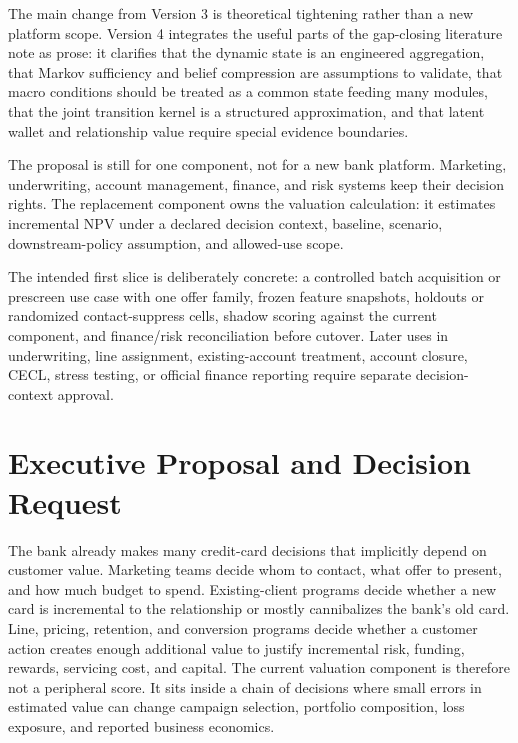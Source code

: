 \documentclass[11pt]{article}
\newcommand{\1}{\mathbf{1}}
\begin{document}
The main change from Version 3 is theoretical tightening rather than a new
platform scope. Version 4 integrates the useful parts of the gap-closing
literature note as prose: it clarifies that the dynamic state is an engineered
aggregation, that Markov sufficiency and belief compression are assumptions to
validate, that macro conditions should be treated as a common state feeding many
modules, that the joint transition kernel is a structured approximation, and
that latent wallet and relationship value require special evidence boundaries.

The proposal is still for one component, not for a new bank platform.  Marketing,
underwriting, account management, finance, and risk systems keep their decision
rights.  The replacement component owns the valuation calculation: it estimates
incremental NPV under a declared decision context, baseline, scenario,
downstream-policy assumption, and allowed-use scope.

The intended first slice is deliberately concrete: a controlled batch
acquisition or prescreen use case with one offer family, frozen feature
snapshots, holdouts or randomized contact-suppress cells, shadow scoring against
the current component, and finance/risk reconciliation before cutover. Later
uses in underwriting, line assignment, existing-account treatment, account
closure, CECL, stress testing, or official finance reporting require separate
decision-context approval.

\tableofcontents
\clearpage

\section{Executive Proposal and Decision Request}
\label{sec:executive-charter}

The bank already makes many credit-card decisions that implicitly depend on
customer value. Marketing teams decide whom to contact, what offer to present,
and how much budget to spend. Existing-client programs decide whether a new
card is incremental to the relationship or mostly cannibalizes the bank's old
card. Line, pricing, retention, and conversion programs decide whether a
customer action creates enough additional value to justify incremental risk,
funding, rewards, servicing cost, and capital. The current valuation component
is therefore not a peripheral score. It sits inside a chain of decisions where
small errors in estimated value can change campaign selection, portfolio
composition, loss exposure, and reported business economics.
\end{document}
